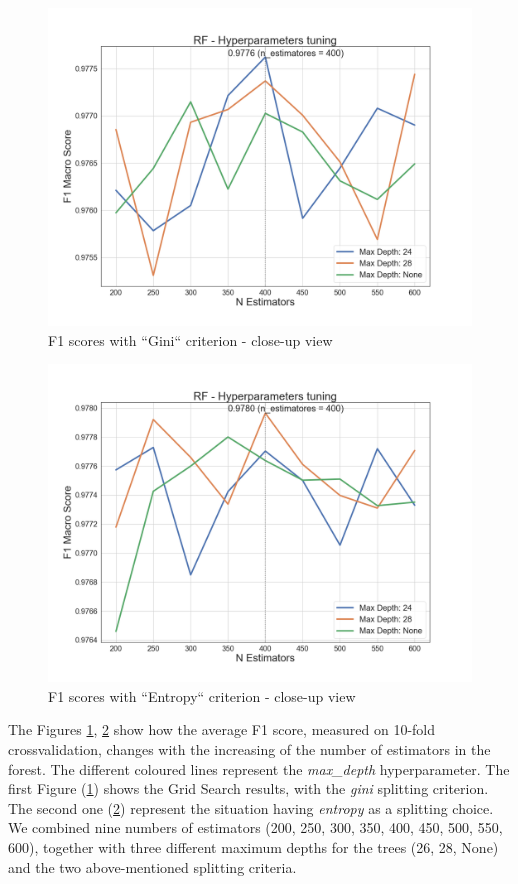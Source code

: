 \begin{figure}[htp!]
	\centering
	\includegraphics[width=\columnwidth]{chapter5/figure/multiclass_rf_tuning_gini.png}
	\caption{F1 scores with ``Gini`` criterion - close-up view}
	\label{fig:rf_tuning_gini}
\end{figure}
\begin{figure}[htp!]
	\centering
	\includegraphics[width=\columnwidth]{chapter5/figure/multiclass_rf_tuning.png}
	\caption{F1 scores with ``Entropy`` criterion - close-up view}
	\label{fig:rf_tuning_entropy}
\end{figure}

The Figures \ref{fig:rf_tuning_gini}, \ref{fig:rf_tuning_entropy} show how the average F1 score, measured on 10-fold crossvalidation, changes with the increasing of the number of estimators in the forest.
The different coloured lines represent the \textit{max\_depth} hyperparameter.
The first Figure (\ref{fig:rf_tuning_gini}) shows the Grid Search results, with the \textit{gini} splitting criterion.
The second one (\ref{fig:rf_tuning_entropy}) represent the situation having \textit{entropy} as a splitting choice.
We combined nine numbers of estimators (200, 250, 300, 350, 400, 450, 500, 550, 600), together with three different maximum depths for the trees (26, 28, None) and the two above-mentioned splitting criteria.

